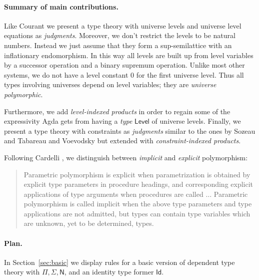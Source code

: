\documentclass[11pt,a4paper]{article}
\theoremstyle{definition}
\newcommand{\Id}{\mathsf{Id}}
\newcommand{\NN}{\mathsf{N}}
\newcommand{\AgdaLevel}{\mathsf{Level}}
\begin{document}
\paragraph{Summary of main contributions.}
Like Courant we present a type theory with
universe levels  and universe level equations as \emph{judgments}. Moreover, we don't restrict the levels to be natural numbers. Instead we just assume that they form a sup-semilattice with an inflationary endomorphism. In this way all levels are built up from level variables by a successor operation and a binary supremum operation. Unlike most other systems, we do not have a level constant $0$ for the first universe level. Thus all types involving universes depend on level variables; they are {\em universe polymorphic}.

Furthermore, we add
\emph{level-indexed products} in order to regain some of the expressivity Agda gets from having a \emph{type}
$\AgdaLevel$ of universe levels.
Finally, we present a type theory with constraints as \emph{judgments} similar to the ones by Sozeau and Tabareau \cite{SozeauTabareau:coq} and Voevodsky \cite{VV} but extended with \emph{constraint-indexed products}.

Following Cardelli \cite{Cardelli87}, we distinguish between 
{\em implicit} and {\em explicit} polymorphism:
\begin{quotation}
  Parametric polymorphism is explicit when parametrization is obtained by
explicit type parameters in procedure headings, and corresponding explicit
applications of type arguments when procedures are called $\dots$
Parametric polymorphism is called implicit when the above type parameters and type applications are not admitted, but
types can contain type variables which are unknown, yet to be determined, types.
\end{quotation}




\paragraph{Plan.}
In Section~\ref{sec:basic} we display rules for a basic version of dependent 
type theory with $\Pi, \Sigma, \NN$, and an identity type former $\Id$.
\end{document}
